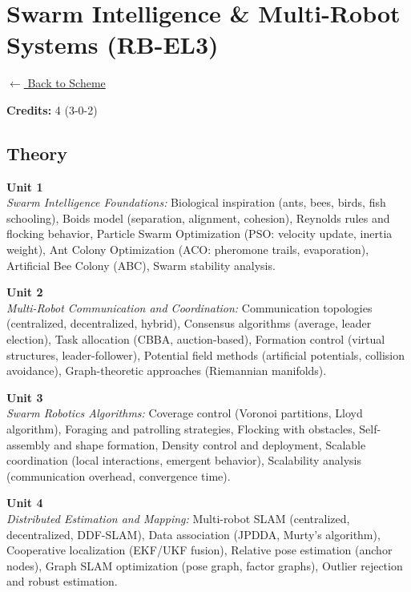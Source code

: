 \section*{Swarm Intelligence \& Multi-Robot Systems (RB-EL3)}
\label{elec:RB_3}

\noindent \small{\hyperref[main:scheme]{$\leftarrow$ Back to Scheme}} \vspace{0.5cm}

\noindent \textbf{Credits:} 4 (3-0-2)

\subsection*{Theory}
\noindent\textbf{Unit 1} \\
\textit{Swarm Intelligence Foundations:} Biological inspiration (ants, bees, birds, fish schooling), Boids model (separation, alignment, cohesion), Reynolds rules and flocking behavior, Particle Swarm Optimization (PSO: velocity update, inertia weight), Ant Colony Optimization (ACO: pheromone trails, evaporation), Artificial Bee Colony (ABC), Swarm stability analysis.

\vspace{0.3cm}

\noindent\textbf{Unit 2} \\
\textit{Multi-Robot Communication and Coordination:} Communication topologies (centralized, decentralized, hybrid), Consensus algorithms (average, leader election), Task allocation (CBBA, auction-based), Formation control (virtual structures, leader-follower), Potential field methods (artificial potentials, collision avoidance), Graph-theoretic approaches (Riemannian manifolds).

\vspace{0.3cm}

\noindent\textbf{Unit 3} \\
\textit{Swarm Robotics Algorithms:} Coverage control (Voronoi partitions, Lloyd algorithm), Foraging and patrolling strategies, Flocking with obstacles, Self-assembly and shape formation, Density control and deployment, Scalable coordination (local interactions, emergent behavior), Scalability analysis (communication overhead, convergence time).

\vspace{0.3cm}

\noindent\textbf{Unit 4} \\
\textit{Distributed Estimation and Mapping:} Multi-robot SLAM (centralized, decentralized, DDF-SLAM), Data association (JPDDA, Murty's algorithm), Cooperative localization (EKF/UKF fusion), Relative pose estimation (anchor nodes), Graph SLAM optimization (pose graph, factor graphs), Outlier rejection and robust estimation.

